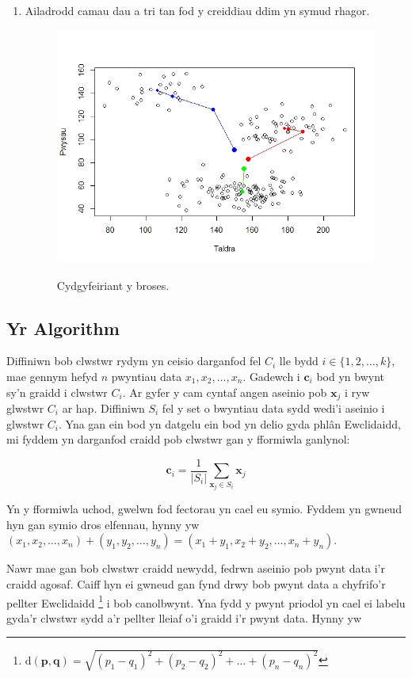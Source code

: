 \begin{enumerate}
\item Ailadrodd camau dau a tri tan fod y creiddiau ddim yn symud rhagor.

\begin{figure}[H]
\begin{center}
\includegraphics[width=0.5\linewidth]{../img/Convergence4.jpeg}
\label{fig:cydgyfeiriant-y-broses}
\caption{Cydgyfeiriant y broses.}
\end{center}
\end{figure}

\end{enumerate}  

\subsection{Yr Algorithm}

Diffiniwn bob clwstwr rydym yn ceisio darganfod fel $C_i$ lle bydd $i \in \{ 1, 2, \dots, k\}$, mae gennym hefyd $n$ pwyntiau data $x_1, x_2, \dots, x_n$. Gadewch i $\mathbf{c}_i$ bod yn bwynt sy'n graidd i clwstwr $C_i$. Ar gyfer y cam cyntaf angen aseinio pob $\mathbf{x}_j$ i ryw glwstwr $C_i$ ar hap. Diffiniwn $S_i$ fel y set o bwyntiau data sydd wedi'i aseinio i glwstwr $C_i$. Yna gan ein bod yn datgelu ein bod yn delio gyda phl\^{a}n Ewclidaidd, mi fyddem yn darganfod craidd pob clwstwr gan y fformiwla ganlynol:

\begin{equation}
\mathbf{c}_i = \frac{1}{|S_i|}\sum_{\mathbf{x}_j \in S_i} {\mathbf{x}_j}
\end{equation}

Yn y fformiwla uchod, gwelwn fod fectorau yn cael eu symio. Fyddem yn gwneud hyn gan symio dros elfennau, hynny yw $ (x_1,x_2,\dots,x_n) + (y_1,y_2,\dots,y_n) = (x_1 + y_1, x_2 + y_2,\dots,x_n + y_n)$.

Nawr mae gan bob clwstwr craidd newydd, fedrwn aseinio pob pwynt data i'r craidd agosaf. Caiff hyn ei gwneud gan fynd drwy bob pwynt data a chyfrifo'r pellter Ewclidaidd \footnote{$  \text{d}(\mathbf{p} , \mathbf{q} ) = \sqrt{(p_1-q_1)^2+(p_2-q_2)^2+\dots+(p_n-q_n)^2}$} i bob canolbwynt. Yna fydd y pwynt priodol yn cael ei labelu gyda'r clwstwr sydd a'r pellter lleiaf o'i graidd i'r pwynt data. Hynny yw

